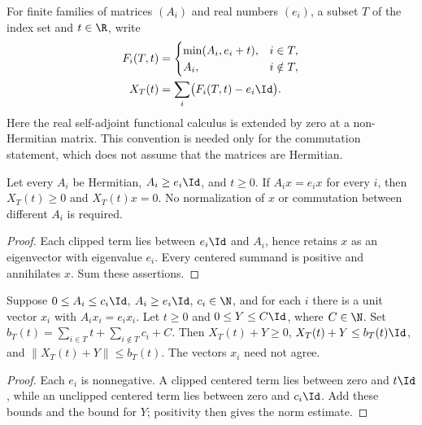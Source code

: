 For finite families of matrices $(A_i)$ and real numbers $(e_i)$, a subset
$T$ of the index set and
$t\in\R$, write
\begin{align}
    F_i(T,t) & =
    \begin{cases}\min(A_i,e_i+t),&i\in T,\\A_i,&i\notin T,\end{cases}
    \label{eq:partial_clipping_terms}              \\
    X_T(t)   & =\sum_i\bigl(F_i(T,t)-e_i\Id\bigr).
    \label{eq:partial_clipping_sum}
\end{align}
Here the real self-adjoint functional calculus is extended by zero at a
non-Hermitian matrix. This convention is needed only for the commutation
statement, which does not assume that the matrices are Hermitian.

\begin{theorem}
    \label{thm:partial_clipping_common_vector}
    \leanok
    Let every $A_i$ be Hermitian, $A_i\ge e_i\Id$, and $t\ge0$.
    If $A_ix=e_ix$ for every $i$, then $X_T(t)\ge0$ and $X_T(t)x=0$.
    No normalization of $x$ or commutation between different $A_i$ is required.
\end{theorem}
\begin{proof}
    \leanok
    Each clipped term lies between $e_i\Id$ and $A_i$, hence retains $x$ as
    an eigenvector with eigenvalue $e_i$. Every centered summand is positive
    and annihilates $x$. Sum these assertions.
\end{proof}

\begin{theorem}
    \label{thm:partial_clipping_norm_budget}
    \leanok
    Suppose $0\le A_i\le c_i\Id$, $A_i\ge e_i\Id$, $c_i\in\N$, and for each
    $i$ there is a unit vector $x_i$ with $A_ix_i=e_ix_i$.
    Let $t\ge0$ and $0\le Y\le C\Id$, where $C\in\N$. Set
    $b_T(t)=\sum_{i\in T}t+\sum_{i\notin T}c_i+C$.
    Then $X_T(t)+Y\ge0$, $X_T(t)+Y\le b_T(t)\Id$, and
    $\|X_T(t)+Y\|\le b_T(t)$. The vectors $x_i$ need not agree.
\end{theorem}
\begin{proof}
    \leanok
    Each $e_i$ is nonnegative. A clipped centered term lies between zero
    and $t\Id$, while an unclipped centered term lies between zero and $c_i\Id$.
    Add these bounds and the bound for $Y$; positivity then gives the norm estimate.
\end{proof}

